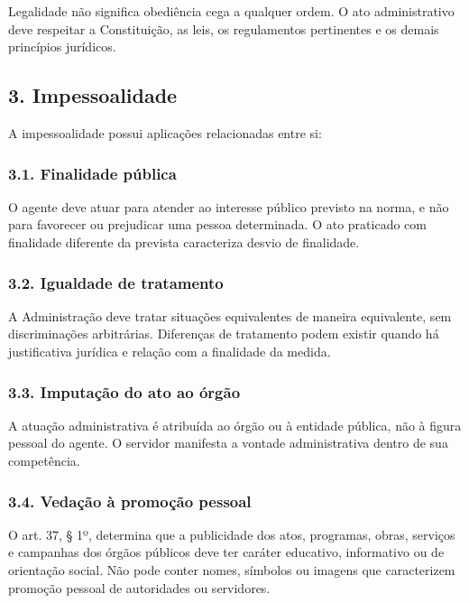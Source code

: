 \documentclass[11pt,a4paper]{article}
\begin{document}
Legalidade não significa obediência cega a qualquer ordem. O ato administrativo deve respeitar a Constituição, as leis, os regulamentos pertinentes e os demais princípios jurídicos.

\subsection*{3. Impessoalidade}

A impessoalidade possui aplicações relacionadas entre si:

\subsubsection*{3.1. Finalidade pública}

O agente deve atuar para atender ao interesse público previsto na norma, e não para favorecer ou prejudicar uma pessoa determinada. O ato praticado com finalidade diferente da prevista caracteriza desvio de finalidade.

\subsubsection*{3.2. Igualdade de tratamento}

A Administração deve tratar situações equivalentes de maneira equivalente, sem discriminações arbitrárias. Diferenças de tratamento podem existir quando há justificativa jurídica e relação com a finalidade da medida.

\subsubsection*{3.3. Imputação do ato ao órgão}

A atuação administrativa é atribuída ao órgão ou à entidade pública, não à figura pessoal do agente. O servidor manifesta a vontade administrativa dentro de sua competência.

\subsubsection*{3.4. Vedação à promoção pessoal}

O art. 37, § 1º, determina que a publicidade dos atos, programas, obras, serviços e campanhas dos órgãos públicos deve ter caráter educativo, informativo ou de orientação social. Não pode conter nomes, símbolos ou imagens que caracterizem promoção pessoal de autoridades ou servidores.
\end{document}
